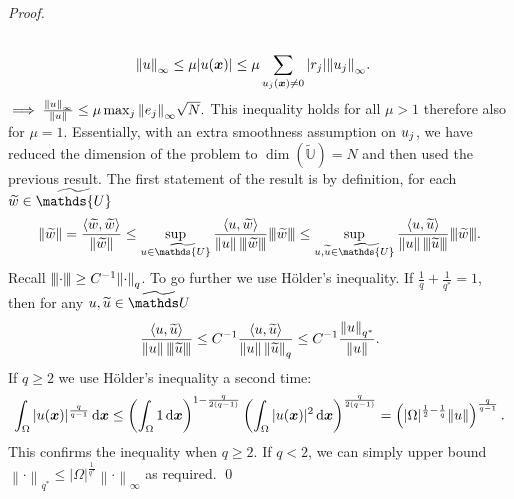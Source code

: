 \documentclass[smallextended]{svjour3}
\let\F\mathds\let\C\mathcal\newcommand{\R}{\F{R}}\newcommand{\A}{\tens{A}}
\newcommand{\norm}[1]{{\left\lVert #1 \right\rVert}}
\newcommand{\Norm}[1]{{\left\vert\kern-0.25ex\left\vert\kern-0.25ex\left\vert #1 \right\vert\kern-0.25ex\right\vert\kern-0.25ex\right\vert}}
\newcommand{\IP}[2]{\left\langle #1,#2 \right\rangle}
\newcommand{\op}[1]{\operatorname{#1}}
\newcommand{\1}{\F{1}}
\newcommand{\diff}{\mathop{}\!\mathrm{d}}
\newcommand{\Domain}{\Omega}\newcommand{\domain}{\omega}
\newcommand*{\var}[1]{%
	\IfEqCase{#1}{%
		{0}{u}%
		{1}{v}%
		{2}{w}%
	}[u#1]%
}
\begin{document}
\begin{proof}
{\begin{align}
			\\\norm{\var0}_\infty \leq \mu|\var0(\vec{x})| &\leq \mu\sum_{\var0_j(\vec{x})\neq 0} |r_j|\norm{\var0_j}_\infty.
		\end{align}
		$\implies \frac{\norm{\var0}_\infty}{\norm{\var0}} \leq \mu\max_j\norm{e_j}_\infty\sqrt{N}.$
		This inequality holds for all $\mu>1$ therefore also for $\mu=1$. 
		Essentially, with an extra smoothness assumption on $\var0_j$, we have reduced the dimension of the problem to $\op{dim}(\tilde{\F{U}})=N $ and then used the previous result.
	}{%
		The first statement of the result is by definition, for each $\tilde{\var2}\in\tilde{\F{U}}$
		$$ \norm{\tilde{\var2}} = \frac{\IP{\tilde{\var2}}{\tilde{\var2}}}{\norm{\tilde{\var2}}} \leq \sup_{\var0\in\tilde{\F{U}}} \frac{\IP{\var0}{\tilde{\var2}}}{\norm{\var0}\,\Norm{\tilde{\var2}}}\Norm{\tilde{\var2}} \leq \sup_{\var0,\tilde{\var0}\in\tilde{\F{U}}} \frac{\IP{\var0}{\tilde{\var0}}}{\norm{\var0}\,\Norm{\tilde{\var0}}}\Norm{\tilde{\var2}}. $$
		Recall $\Norm\cdot\geq C^{-1}\norm\cdot_q$. To go further we use H\"older's inequality. If $\frac1q+\frac{1}{q^*}=1$, then for any $\var0,\tilde{\var0}\in\tilde{\F U}$
		\begin{equation}
			\frac{\IP{\var0}{\tilde{\var0}}}{\norm{\var0}\,\Norm{\tilde{\var0}}} \leq C^{-1}\frac{\IP{\var0}{\tilde{\var0}}}{\norm{\var0}\,\norm{\tilde{\var0}}_q} 
			\leq C^{-1}\frac{\norm{\var0}_{q^*}}{\norm{\var0}}.
		\end{equation}
		If $q\geq2$ we use H\"older's inequality a second time:
		\begin{equation}
			\int_\Domain |\var0(\vec x)|^{\frac{q}{q-1}}\diff\vec{x} \leq \left(\int_\Domain 1\diff\vec{x}\right)^{1-\frac{q}{2(q-1)}}\left(\int_\Domain |\var0(\vec x)|^2\diff\vec{x}\right)^{\frac{q}{2(q-1)}} = \left(|\Domain|^{\frac{1}{2} -\frac{1}{q}}\norm{\var0}\right)^{\frac{q}{q-1}}.
		\end{equation}
		This confirms the inequality when $q\geq2$. If $q<2$, we can simply upper bound $\norm\cdot_{q^*}\leq |\Domain|^{\frac1{q^*}}\norm\cdot_\infty$ as required.
	}
	\qed\end{proof}
	
\end{document}
